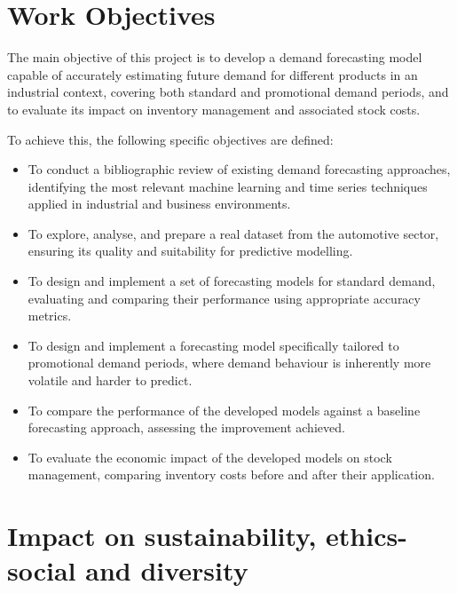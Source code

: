 \documentclass[ENG]{TFUOC}%
\begin{document}
\section{Work Objectives}

The main objective of this project is to develop a demand forecasting 
model capable of accurately estimating future demand for different 
products in an industrial context, covering both standard and 
promotional demand periods, and to evaluate its impact on inventory 
management and associated stock costs.

To achieve this, the following specific objectives are defined:

\begin{itemize}
    \item To conduct a bibliographic review of existing demand 
    forecasting approaches, identifying the most relevant machine 
    learning and time series techniques applied in industrial and 
    business environments.

    \item To explore, analyse, and prepare a real dataset from the 
    automotive sector, ensuring its quality and suitability for 
    predictive modelling.

    \item To design and implement a set of forecasting models for 
    standard demand, evaluating and comparing their performance using 
    appropriate accuracy metrics.

    \item To design and implement a forecasting model specifically 
    tailored to promotional demand periods, where demand behaviour 
    is inherently more volatile and harder to predict.

    \item To compare the performance of the developed models against 
    a baseline forecasting approach, assessing the improvement 
    achieved.

    \item To evaluate the economic impact of the developed models 
    on stock management, comparing inventory costs before and after 
    their application.
\end{itemize}

\section{Impact on sustainability, ethics-social and diversity}
\label{s:etic}
\end{document}
